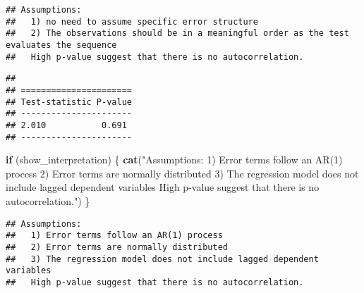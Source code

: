 \documentclass[
]{article}
\newenvironment{Shaded}{\begin{snugshade}}{\end{snugshade}}
\newcommand{\AttributeTok}[1]{\textcolor[rgb]{0.13,0.29,0.53}{#1}}
\newcommand{\CommentTok}[1]{\textcolor[rgb]{0.56,0.35,0.01}{\textit{#1}}}
\newcommand{\ControlFlowTok}[1]{\textcolor[rgb]{0.13,0.29,0.53}{\textbf{#1}}}
\newcommand{\DecValTok}[1]{\textcolor[rgb]{0.00,0.00,0.81}{#1}}
\newcommand{\FunctionTok}[1]{\textcolor[rgb]{0.13,0.29,0.53}{\textbf{#1}}}
\newcommand{\NormalTok}[1]{#1}
\newcommand{\OtherTok}[1]{\textcolor[rgb]{0.56,0.35,0.01}{#1}}
\newcommand{\SpecialCharTok}[1]{\textcolor[rgb]{0.81,0.36,0.00}{\textbf{#1}}}
\newcommand{\StringTok}[1]{\textcolor[rgb]{0.31,0.60,0.02}{#1}}
\begin{document}
\begin{verbatim}
## Assumptions:
##   1) no need to assume specific error structure
##   2) The observations should be in a meaningful order as the test evaluates the sequence
##   High p-value suggest that there is no autocorrelation.
\end{verbatim}

\begin{Shaded}
\end{Shaded}

\begin{verbatim}
## 
## ======================
## Test-statistic P-value
## ----------------------
## 2.010           0.691 
## ----------------------
\end{verbatim}

\begin{Shaded}
\begin{Highlighting}[]
\ControlFlowTok{if}\NormalTok{ (show\_interpretation) \{}
  \FunctionTok{cat}\NormalTok{(}\StringTok{"Assumptions:}
\StringTok{  1) Error terms follow an AR(1) process}
\StringTok{  2) Error terms are normally distributed}
\StringTok{  3) The regression model does not include lagged dependent variables}
\StringTok{  High p{-}value suggest that there is no autocorrelation."}\NormalTok{)}
\NormalTok{  \}}
\end{Highlighting}
\end{Shaded}

\begin{verbatim}
## Assumptions:
##   1) Error terms follow an AR(1) process
##   2) Error terms are normally distributed
##   3) The regression model does not include lagged dependent variables
##   High p-value suggest that there is no autocorrelation.
\end{verbatim}

\begin{Shaded}
\end{Shaded}
\end{document}

